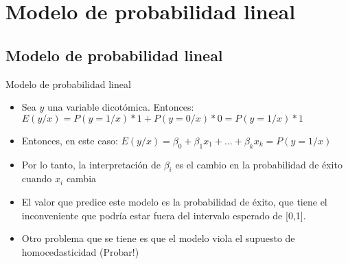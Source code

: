\section[Modelo]{Modelo de probabilidad lineal}

\subsection{Modelo de probabilidad lineal}
\begin{frame}{Modelo de probabilidad lineal}
	\begin{itemize}
		\item
		Sea $y$ una variable dicotómica. Entonces: $E(y/x)=P(y=1/x)*1+P(y=0/x)*0=P(y=1/x)*1$
		\pause
		\item
		Entonces, en este caso: $E(y/x)=\beta_{0}+\beta_{1}x_{1}+...+\beta_{k}x_{k}=P(y=1/x)$
		\pause
		\item Por lo tanto, la interpretación de $\beta_{i}$ es el cambio en la probabilidad de éxito cuando $x_{i}$ cambia
		\pause
		\item El valor que predice este modelo es la probabilidad de éxito, que tiene el inconveniente que podría estar fuera del intervalo
		esperado de [0,1].
		\pause
		\item Otro problema que se tiene es que el modelo viola el supuesto de homocedasticidad (Probar!)
	\end{itemize}
\end{frame}
